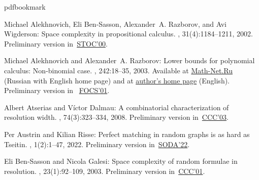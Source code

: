\newcommand{\prelim}{Preliminary version in\ }\newcommand{\prelims}{Preliminary
  versions in\ }
\providecommand{\bibhead}[1]{}
\expandafter\ifx\csname pdfbookmark\endcsname\relax%
  \providecommand{\tocrefpdfbookmark}{}
\else\providecommand{\tocrefpdfbookmark}{%
   \hypertarget{tocreferences}{}%
   \pdfbookmark[1]{References}{tocreferences}}%
\fi

\tocrefpdfbookmark
\begin{thebibliography}{10}

\bibhead{ABRW}
{\sc Michael Alekhnovich, Eli {Ben-Sasson}, Alexander~A. Razborov, and Avi
  Wigderson}: Space complexity in propositional calculus.
, 31(4):1184--1211, 2002.
\newblock \prelim \href{https://doi.org/10.1145/335305.335347}{STOC'00}.
\newblock [\epfmtdoi{10.1137/S0097539700366735}]

\bibhead{DBLP:conf/focs/AlekhnovichR01}
{\sc Michael Alekhnovich and Alexander~A. Razborov}: Lower bounds for
  polynomial calculus: {N}on-binomial case.
, 242:18--35, 2003.
\newblock Available at \href{https://www.mathnet.ru/eng/tm403}{Math-Net.Ru}
  (Russian with English home page) and at
  \href{http://people.cs.uchicago.edu/~razborov/files/misha.pdf}{author's home
  page} (English). \prelim
  \href{https://doi.org/10.1109/SFCS.2001.959893}{FOCS'01}.

\bibhead{DBLP:journals/jcss/AtseriasD08}
{\sc Albert Atserias and Víctor Dalmau}: A combinatorial characterization of
  resolution width.
, 74(3):323--334, 2008.
\newblock \prelim \href{https://doi.org/10.1109/CCC.2003.1214424}{CCC'03}.

\bibhead{DBLP:conf/soda/AustrinR22}
{\sc Per Austrin and Kilian Risse}: Perfect matching in random graphs is as
  hard as {T}seitin.
, 1(2):1--47, 2022.
\newblock \prelim \href{https://doi.org/10.1137/1.9781611977073.43}{SODA'22}.

\bibhead{DBLP:journals/rsa/Ben-SassonG03}
{\sc Eli {Ben-Sasson} and Nicola Galesi}: Space complexity of random formulae
  in resolution.
, 23(1):92--109, 2003.
\newblock \prelim \href{https://doi.org/10.1109/CCC.2001.933871}{CCC'01}.


\end{thebibliography}

